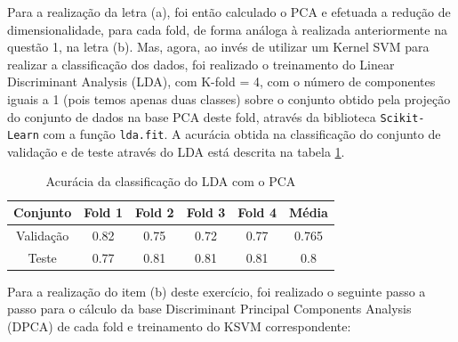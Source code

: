 \documentclass[]{abntex2}
\begin{document}
Para a realização da letra (a), foi então calculado o PCA e efetuada a redução de dimensionalidade, para cada fold, de forma análoga à realizada anteriormente na questão 1, na letra (b). Mas, agora, ao invés de utilizar um Kernel SVM para realizar a classificação dos dados, foi realizado o treinamento do Linear Discriminant Analysis (LDA), com K-fold = 4, com o número de componentes iguais a 1 (pois temos apenas duas classes) sobre o conjunto obtido pela projeção do conjunto de dados na base PCA deste fold, através da biblioteca \texttt{Scikit-Learn} com a função \texttt{lda.fit}. A acurácia obtida na classificação do conjunto de validação e de teste através do LDA está descrita na tabela \ref{tab:lda_clas}.

\begin{table}[H]
    \centering
    \begin{tabular}{|c|c|c|c|c|c|}
    \hline
    \rowcolor[HTML]{C0C0C0} 
    Conjunto                          & Fold 1 & Fold 2 & Fold 3 & Fold 4 & Média  \\ \hline
    \cellcolor[HTML]{C0C0C0}Validação & 0.82   & 0.75  & 0.72   & 0.77   & 0.765  \\ \hline
    \cellcolor[HTML]{C0C0C0}Teste     & 0.77   & 0.81   & 0.81   & 0.81   & 0.8 \\ \hline
    \end{tabular}
    \caption{Acurácia da classificação do LDA com o PCA}
    \label{tab:lda_clas}
\end{table}

Para a realização do item (b) deste exercício, foi realizado o seguinte passo a passo para o cálculo da base Discriminant Principal Components Analysis (DPCA) de cada fold e treinamento do KSVM correspondente:
\end{document}
